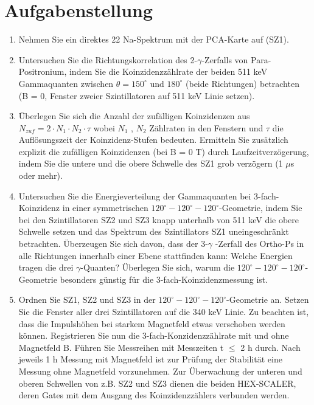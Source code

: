 \section{Aufgabenstellung}

\begin{enumerate}
\item Nehmen Sie ein direktes 22 Na-Spektrum mit der PCA-Karte auf (SZ1). 
\item Untersuchen Sie die Richtungskorrelation des 2-$\gamma$-Zerfalls von Para-Positronium, indem Sie die Koinzidenzzählrate der beiden 511 keV Gammaquanten zwischen $\theta = 150^{\circ}$ und $180^{\circ}$  (beide Richtungen) betrachten (B = 0, Fenster zweier Szintillatoren auf 511 keV Linie setzen). 
\item Überlegen Sie sich die Anzahl der zufälligen Koinzidenzen aus $N_{zuf} = 2\cdot N_1\cdot N_2 \cdot \tau$ wobei $N_1$ , $N_2$ Zählraten in den Fenstern und $\tau$ die Auflösungszeit der Koinzidenz-Stufen bedeuten. Ermitteln Sie zusätzlich explizit die zufälligen Koinzidenzen (bei B = 0 T) durch Laufzeitverzögerung, indem Sie die untere und die obere Schwelle des SZ1 grob verzögern (1 $\mu$s oder mehr). 
\item Untersuchen Sie die Energieverteilung der Gammaquanten bei 3-fach-Koinzidenz in einer symmetrischen $120^{\circ}-120^{\circ}-120^{\circ}$-Geometrie, indem Sie bei den Szintillatoren SZ2 und SZ3 knapp unterhalb 
von 511 keV die obere Schwelle setzen und das Spektrum des Szintillators SZ1 uneingeschränkt betrachten. Überzeugen Sie sich davon, dass der 3-$\gamma$ -Zerfall des Ortho-Ps in alle Richtungen innerhalb einer Ebene stattfinden kann: Welche Energien tragen die drei $\gamma$-Quanten? Überlegen Sie sich, warum die $120^{\circ}-120^{\circ}-120^{\circ}$-Geometrie besonders günstig für die 3-fach-Koinzidenzmessung 
ist.
\item Ordnen Sie SZ1, SZ2 und SZ3 in der $120^{\circ}-120^{\circ}-120^{\circ}$-Geometrie an. Setzen Sie die Fenster aller drei Szintillatoren auf die 340 keV Linie. Zu beachten ist, dass die Impulshöhen bei starkem Magnetfeld etwas verschoben werden können. Registrieren Sie nun die 3-fach-Konzidenzzählrate mit und ohne Magnetfeld B. Führen Sie Messreihen mit Messzeiten t $\leq$ 2 h durch. Nach jeweils 1 h Messung mit Magnetfeld ist zur Prüfung der Stabilität eine Messung ohne Magnetfeld vorzunehmen. Zur Überwachung der unteren und oberen Schwellen von z.B. SZ2 und SZ3 dienen die beiden HEX-SCALER, deren Gates mit dem Ausgang des Koinzidenzzählers verbunden werden. 
\end{enumerate}
